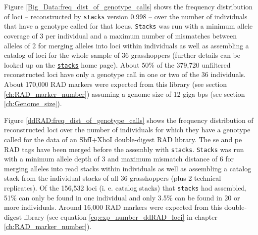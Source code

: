 \documentclass[a4paper,12pt,times,print,index,custombib,custommargin]{PhDThesisPSnPDF}\usepackage[]{graphicx}\usepackage[]{color}
\begin{document}
Figure \ref{Big_Data:freq_dist_of_genotype_calls} shows the frequency distribution of loci -- reconstructed by \texttt{stacks} version 0.998 -- over the number of individuals that have a genotype called for that locus. \texttt{Stacks} was run with a minimum allele coverage of 3 per individual and a maximum number of mismatches between alleles of 2 for merging alleles into loci within individuals as well as assembling a catalog of loci for the whole sample of 36 grasshoppers (further details can be looked up on the \href{http://creskolab.uoregon.edu/stacks/param_tut.php}{\texttt{stacks}} home page). About 50\% of the 379,720 unfiltered reconstructed loci have only a genotype call in one or two of the 36 individuals. About 170,000 RAD markers were expected from this library (see section \ref{ch:RAD_marker_number}) assuming a genome size of 12 giga \glspl{bp} (see section \ref{ch:Genome_size}).


Figure \ref{ddRAD:freq_dist_of_genotype_calls} shows the frequency distribution of reconstructed loci over the number of individuals for which they have a genotype called for the data of an \gls{SbfI}$+$\gls{XhoI} double-digest RAD library. The \gls{se} and \gls{pe} \glspl{RAD tag} have been merged before the assembly with \texttt{stacks}. \texttt{Stacks} was run with a minimum allele depth of 3 and maximum mismatch distance of 6 for merging alleles into read stacks within individuals as well as assembling a catalog stack from the individual stacks of all 36 grasshoppers (plus 2 technical replicates). Of the 156,532 loci (i. e. catalog stacks) that \texttt{stacks} had assembled, 51\% can only be found in one individual and only 3.5\% can be found in 20 or more individuals. Around 16,000 RAD markers were expected from this double-digest library (see equation \ref{eq:exp_number_ddRAD_loci} in chapter \ref{ch:RAD_marker_number}).

\end{document}
